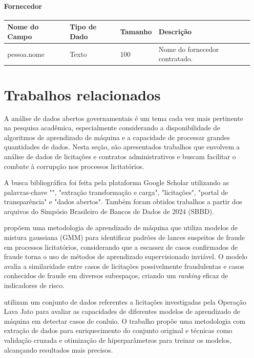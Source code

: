 \documentclass[
	12pt,				%
	oneside,			%
	a4paper,			%
	chapter=TITLE,		%
	section=TITLE,		%
	english,			%
	brazil				%
	]{abntex2}
\begin{document}
\subsubsection*{Fornecedor}
\begin{longtable}{|p{4cm}|p{3cm}|p{2cm}|p{6cm}|}
\hline
\textbf{Nome do Campo} & \textbf{Tipo de Dado} & \textbf{Tamanho} & \textbf{Descrição} \\
\hline
pessoa.nome & Texto & 100 & Nome do fornecedor contratado. \\
\hline
\end{longtable}

\chapter{Trabalhos relacionados}

A análise de dados abertos governamentais é um tema cada vez mais pertinente na pesquisa acadêmica, especialmente considerando a disponibilidade de algoritmos de aprendizado de máquina e a capacidade de processar grandes quantidades de dados. Nesta seção, são apresentados trabalhos que envolvem a análise de dados de licitações e contratos administrativos e buscam facilitar o combate à corrupção nos processos licitatórios.

A busca bibliográfica foi feita pela plataforma Google Scholar utilizando as palavras-chave "", "extração transformação e carga", "licitações", "portal de transparência" e "dados abertos". Também foram obtidos trabalhos a partir dos arquivos do Simpósio Brasileiro de Bancos de Dados de 2024 (SBBD).

\cite{schmitz2024sbbd} propõem uma metodologia de aprendizado de máquina que utiliza modelos de mistura gaussiana (GMM) para identificar padrões de lances suspeitos de fraude em processos licitatórios, considerando que a escassez de casos confirmados de fraude torna o uso de métodos de aprendizado supervisionado inviável. O modelo avalia a similaridade entre casos de licitações possivelmente fraudulentas e casos conhecidos de fraude em diversos subespaços, criando um \textit{ranking} eficaz de indicadores de risco.

\cite{schneider2024sbbd} utilizam um conjunto de dados referentes a licitações investigadas pela Operação Lava Jato para avaliar as capacidades de diferentes modelos de aprendizado de máquina em detectar casos de conluio. O trabalho propõe uma metodologia com extração de dados para enriquecimento do conjunto original e técnicas como validação cruzada e otimização de hiperparâmetros para treinar os modelos, alcançando resultados mais precisos.
\end{document}
